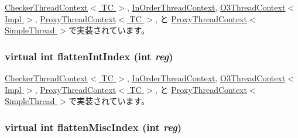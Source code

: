 \hyperlink{classCheckerThreadContext_ab9ea3f8f1a21df875c7273c7377dfac1}{CheckerThreadContext$<$ TC $>$}, \hyperlink{classInOrderThreadContext_ab9ea3f8f1a21df875c7273c7377dfac1}{InOrderThreadContext}, \hyperlink{classO3ThreadContext_ab9ea3f8f1a21df875c7273c7377dfac1}{O3ThreadContext$<$ Impl $>$}, \hyperlink{classProxyThreadContext_ab9ea3f8f1a21df875c7273c7377dfac1}{ProxyThreadContext$<$ TC $>$}, と \hyperlink{classProxyThreadContext_ab9ea3f8f1a21df875c7273c7377dfac1}{ProxyThreadContext$<$ SimpleThread $>$}で実装されています。\hypertarget{classThreadContext_a6940c379416884cb0b9eb04c5193580e}{
\subsubsection[{flattenIntIndex}]{\setlength{\rightskip}{0pt plus 5cm}virtual int flattenIntIndex (int {\em reg})}}
\label{classThreadContext_a6940c379416884cb0b9eb04c5193580e}


\hyperlink{classCheckerThreadContext_aa529f2d70520c578e3e29b3bf1a66312}{CheckerThreadContext$<$ TC $>$}, \hyperlink{classInOrderThreadContext_aa529f2d70520c578e3e29b3bf1a66312}{InOrderThreadContext}, \hyperlink{classO3ThreadContext_aa529f2d70520c578e3e29b3bf1a66312}{O3ThreadContext$<$ Impl $>$}, \hyperlink{classProxyThreadContext_aa529f2d70520c578e3e29b3bf1a66312}{ProxyThreadContext$<$ TC $>$}, と \hyperlink{classProxyThreadContext_aa529f2d70520c578e3e29b3bf1a66312}{ProxyThreadContext$<$ SimpleThread $>$}で実装されています。\hypertarget{classThreadContext_a8014f007a20a06d35f8b13adc3a05816}{
\subsubsection[{flattenMiscIndex}]{\setlength{\rightskip}{0pt plus 5cm}virtual int flattenMiscIndex (int {\em reg})}}
\label{classThreadContext_a8014f007a20a06d35f8b13adc3a05816}


